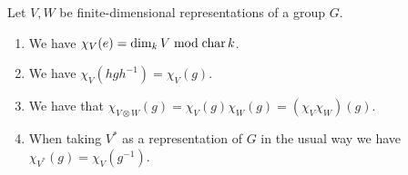 \begin{lemma}
  Let $V, W$ be finite-dimensional representations of a group $G$.
  \begin{enumerate}[label=\emph{\alph*)},leftmargin=*,resume]
    \item
      We have $\chi_V(e) = \dim_k V \bmod \operatorname{char} k$.
    \item
      We have $\chi_V(hgh^{-1}) = \chi_V(g)$.
    \item
      We have that $\chi_{V \otimes W}(g) = \chi_V(g) \chi_W(g) = (\chi_V \chi_W)(g)$.
    \item
      When taking $V^*$ as a representation of $G$ in the usual way we have $\chi_{V^*}(g) = \chi_V(g^{-1})$.
  \end{enumerate}
\end{lemma}


